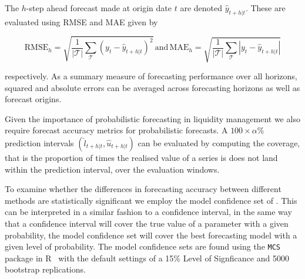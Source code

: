 The $h$-step ahead forecast made at origin date $t$ are denoted $\hat{y}_{t+h|t}$. These are evaluated using RMSE and MAE given by

\[
\textrm{RMSE}_h=\sqrt{\frac{1}{|\mathcal{T}|}\sum_\mathcal{T}(y_t-\hat{y}_{t+h|t})^2}\,\textrm{and}\,\textrm{MAE}_h=\sqrt{\frac{1}{|\mathcal{T}|}\sum_\mathcal{T}|y_t-\hat{y}_{t+h|t}|}
\]

respectively. As a summary measure of forecasting performance over all horizons, squared and absolute errors can be averaged across forecasting horizons as well as forecast origins.

Given the importance of probabilistic forecasting in liquidity management we also require forecast accuracy metrics for probabilistic forecasts. A $100\times\alpha$\% prediction intervals $(\hat{l}_{t+h|t},\hat{u}_{t+h|t})$ can be evaluated by computing the coverage, that is the proportion of times the realised value of a series is does not land within the prediction interval, over the evaluation windows. 

To examine whether the differences in forecasting accuracy between different methods are statistically significant we employ the model confidence set of \citet{HanEtAl2011}. This can be interpreted in a similar fashion to a confidence interval, in the same way that a confidence interval will cover the true value of a parameter with a given probability, the model confidence set will cover the best forecasting model with a given level of probability. The model confidence sets are found using the \texttt{MCS} package in R~\citep{MCSpac} with the default settings of a 15\% Level of Signficance and 5000 bootstrap replications.




